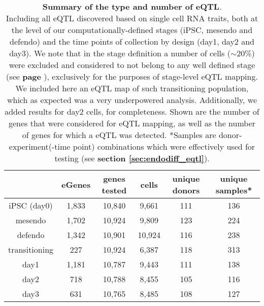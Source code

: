 \begin{table}[h]
    \centering
    \begin{tabular}{c | c c c c c}
     & eGenes & genes tested & cells & unique donors & unique samples*  \\
    \hline
    iPSC (day0) & 1,833 & 10,840 & 9,661 & 111 & 136 \\
    mesendo & 1,702 & 10,924 & 9,809 & 123 & 224 \\
    defendo & 1,342 & 10,901 & 10,924 & 116 & 238\\
    transitioning & 227 & 10,924 & 6,387 & 118 & 313 \\
    day1 & 1,181 & 10,787 & 9,443 & 111 & 138 \\
    day2 & 718 & 10,788 & 8,455 & 105 & 116 \\
    day3 & 631 & 10,765 & 8,485 & 108 & 127 \\
    \end{tabular}
    \caption[Summary of the type and number of eQTL]{\textbf{Summary of the type and number of eQTL}.\\
    Including all eQTL discovered based on single cell RNA traits, both at the level of our computationally-defined stages (iPSC, mesendo and defendo) and the time points of collection by design (day1, day2 and day3).
    We note that in the stage definition a number of cells ($\sim$20\%) were excluded and considered to not belong to any well defined stage (see \textbf{page \pageref{fig:endodiff_stages}}), exclusively for the purposes of stage-level eQTL mapping.
    We included here an eQTL map of such transitioning population, which as expected was a very underpowered analysis.
    Additionally, we added results for day2 cells, for completeness.
    Shown are the number of genes that were considered for eQTL mapping, as well as the number of genes for which a eQTL was detected.
    *Samples are donor-experiment(-time point) combinations which were effectively used for testing (see \textbf{section \ref{sec:endodiff_eqtl}}).}
    \label{tab:endodiff_eqtl_summary}
\end{table}

\vspace{10mm}

